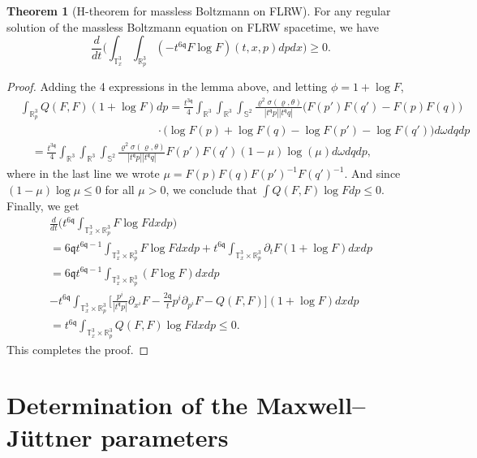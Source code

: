 \documentclass[reqno]{amsart}
\def\R{\mathbb R}
\newcommand{\qq}{\mathfrak{q}}
\theoremstyle{definition}
\newtheorem{theorem}{Theorem}
\numberwithin{equation}{section}
\numberwithin{theorem}{section}
\begin{document}
\begin{theorem}[H-theorem for massless Boltzmann on FLRW]\label{prophthm}
For any regular solution of the massless Boltzmann equation on FLRW spacetime, we have
\[\frac{d}{dt}\bigg(\int_{\mathbb{T}^3_x}\int_{ \mathbb{R}^3_p} (- t^{6\mathfrak{q}}F\log F)(t,x,p) dpdx\bigg)\geq 0.\]
\end{theorem}

\begin{proof}
Adding the 4 expressions in the lemma above, and letting \(\phi=1+\log F\),
\begin{align*}
&\int_{\R^3_p} Q(F,F)(1+\log F)dp=
\frac{t^{3\qq}}{4}\int_{\mathbb{R}^3}\int_{\mathbb{R}^3}\int_{\mathbb{S}^2} \frac{\varrho^2 \sigma(\varrho,\theta)}{|t^{\mathfrak{q}}p||t^{\mathfrak{q}}q|}
\Big(F(p')F(q')-F(p)F(q)\Big)\\
&\qquad\qquad\qquad \qquad\qquad\qquad \cdot\big(\log F(p)+\log F(q)-\log F(p')-\log F(q')\big)d\omega dqdp\\
&\quad=\frac{t^{3\qq}}{4}\int_{\mathbb{R}^3}\int_{\mathbb{R}^3}\int_{\mathbb{S}^2} \frac{\varrho^2 \sigma(\varrho,\theta)}{|t^{\mathfrak{q}}p||t^{\mathfrak{q}}q|}
F(p')F(q') (1-\mu ) \log (\mu) d\omega dqdp,
\end{align*}
where in the last line we wrote \(\mu=F(p)F(q)F(p')^{-1}F(q')^{-1}.\) And since \((1-\mu)\log \mu\leq 0\) for all \(\mu>0\), we conclude that \(\int Q(F,F)\log F dp \leq 0.\) Finally, we get
\begin{multline*}
    \frac{d}{dt}\bigg(t^{6\mathfrak{q}}\int_{\mathbb{T}^3_x\times \mathbb{R}^3_p} F\log F dxdp\bigg)
    \\
    =6\mathfrak{q}t^{6\mathfrak{q}-1}\int_{\mathbb{T}^3_x\times \mathbb{R}^3_p} F\log F dxdp+t^{6\mathfrak{q}}\int_{\mathbb{T}^3_x\times \mathbb{R}^3_p} \partial_t F(1+\log F) dxdp
    \\
=6\mathfrak{q}t^{6\mathfrak{q}-1}\int_{\mathbb{T}^3_x\times \mathbb{R}^3_p} (F\log F) dxdp
\\
-t^{6\mathfrak{q}}\int_{\mathbb{T}^3_x\times \mathbb{R}^3_p} \Big[\frac{p^i}{|t^{\qq}p|} \partial_{x^i} F -\frac{2\qq}{t}p^i \partial_{p^i} F-Q(F,F)\Big](1+\log F) dxdp
\\
=t^{6\mathfrak{q}}\int_{\mathbb{T}^3_x\times \mathbb{R}^3_p} Q(F,F)\log F dxdp\leq 0.
\end{multline*}
This completes the proof.
\end{proof}

\section{Determination of the Maxwell--J\"uttner parameters}\label{MJparamet}
\end{document}
